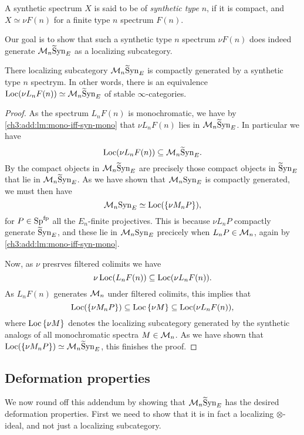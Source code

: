 \begin{definition}
    A synthetic spectrum $X$ is said to be of \emph{synthetic type} $n$, if it is compact, and $X\simeq \nu F(n)$ for a finite type $n$ spectrum $F(n)$. 
\end{definition}

Our goal is to show that such a synthetic type $n$ spectrum $\nu F(n)$ does indeed generate $\mathcal{M}_{n} \widetilde{\mathrm{S}}\mathrm{yn}_{E}$ as a localizing subcategory. 

\begin{lemma}
    \label{ch3:add:monochromatic-synthetic-is-gen-by-type-n}
    There localizing subcategory $\mathcal{M}_{n}\widetilde{\mathrm{S}}\mathrm{yn}_{E}$ is compactly generated by a synthetic type $n$ spectrym. In other words, there is an equivalence $\operatorname{Loc}(\nu L_n F(n))\simeq \mathcal{M}_{n}\widetilde{\mathrm{S}}\mathrm{yn}_{E}$ of stable $\infty$-categories. 
\end{lemma}
\begin{proof}
    As the spectrum $L_n F(n)$ is monochromatic, we have by \cref{ch3:add:lm:mono-iff-syn-mono} that $\nu L_n F(n)$ lies in $\mathcal{M}_{n}\widetilde{\mathrm{S}}\mathrm{yn}_{E}$. In particular we have 
    \[\operatorname{Loc}(\nu L_n F(n))\subseteq \mathcal{M}_{n}\widetilde{\mathrm{S}}\mathrm{yn}_{E}.\]
    By \cite[2.2]{neeman_1992} the compact objects in $\mathcal{M}_{n}\widetilde{\mathrm{S}}\mathrm{yn}_{E}$ are precisely those compact objects in $\widetilde{\mathrm{S}}\mathrm{yn}_{E}$ that lie in $\mathcal{M}_{n}\widetilde{\mathrm{S}}\mathrm{yn}_{E}$. As we have shown that $\mathcal{M}_{n}\mathrm{Syn}_{E}$ is compactly generated, we must then have 
    \[\mathcal{M}_{n}\mathrm{Syn}_{E} \simeq \operatorname{Loc}(\{\nu M_n P\}),\]
    for $P \in \mathrm{Sp}^{\mathrm{fp}}$ all the $E_n$-finite projectives. This is because $\nu L_n P$ compactly generate $\widetilde{\mathrm{S}}\mathrm{yn}_{E}$, and these lie in $\mathcal{M}_{n}\mathrm{Syn}_{E}$ precicely when $L_n P\in \mathcal{M}_{n}$, again by \cref{ch3:add:lm:mono-iff-syn-mono}. 

    Now, as $\nu$ presrves filtered colimits we have 
    \[\nu \operatorname{Loc}(L_n F(n))\subseteq \operatorname{Loc}(\nu L_n F(n)).\]
    As $L_n F(n)$ generates $\mathcal{M}_{n}$ under filtered colimits, this implies that 
    \[\operatorname{Loc}(\{\nu M_n P\})\subseteq \operatorname{Loc}{\{\nu M\}} \subseteq \operatorname{Loc}(\nu L_n F(n)),\]
    where $\operatorname{Loc}{\{\nu M\}}$ denotes the localizing subcategory generated by the synthetic analogs of all monochromatic spectra $M\in \mathcal{M}_{n}$. As we have shown that $\operatorname{Loc}(\{\nu M_n P\})\simeq \mathcal{M}_{n}\widetilde{\mathrm{S}}\mathrm{yn}_{E}$, this finishes the proof. 
\end{proof}



\subsection{Deformation properties}

We now round off this addendum by showing that $\mathcal{M}_{n}\widetilde{\mathrm{S}}\mathrm{yn}_{E}$ has the desired deformation properties. First we need to show that it is in fact a localizing $\otimes$-ideal, and not just a localizing subcategory. 

